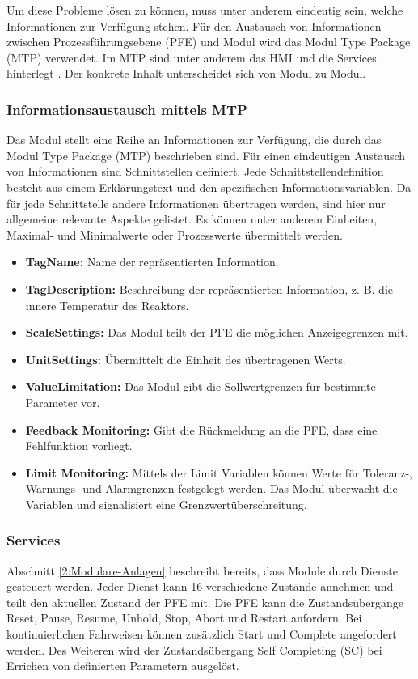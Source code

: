 Um diese Probleme lösen zu können, muss unter anderem eindeutig sein, welche Informationen zur Verfügung stehen. Für den Austausch von Informationen zwischen Prozessführungsebene (PFE) und Modul wird das Modul Type Package (MTP) verwendet. Im MTP sind unter anderem das HMI und die Services hinterlegt \cite{VDI2658-Blatt1}. Der konkrete Inhalt unterscheidet sich von Modul zu Modul.

\subsubsection*{Informationsaustausch mittels MTP}
Das Modul stellt eine Reihe an Informationen zur Verfügung, die durch das Modul Type Package (MTP) beschrieben sind. Für einen eindeutigen Austausch von Informationen sind Schnittstellen definiert. Jede Schnittstellendefinition besteht aus einem Erklärungstext und den spezifischen Informationsvariablen. Da für jede Schnittstelle andere Informationen übertragen werden, sind hier nur allgemeine relevante Aspekte gelistet. Es können unter anderem Einheiten, Maximal- und Minimalwerte oder Prozesswerte übermittelt werden. \cite{VDI2658-Blatt3}
\begin{itemize}
\item \textbf{TagName:} Name der repräsentierten Information. 
\item \textbf{TagDescription:} Beschreibung der repräsentierten Information, z. B. die innere Temperatur des Reaktors.
\item \textbf{ScaleSettings:} Das Modul teilt der PFE die möglichen Anzeigegrenzen mit.
\item \textbf{UnitSettings:} Übermittelt die Einheit des übertragenen Werts.
\item \textbf{ValueLimitation:} Das Modul gibt die Sollwertgrenzen für bestimmte Parameter vor.
\item \textbf{Feedback Monitoring:} Gibt die Rückmeldung an die PFE, dass eine Fehlfunktion vorliegt.
\item \textbf{Limit Monitoring:} Mittels der Limit Variablen können Werte für Toleranz-, Warnungs- und Alarmgrenzen festgelegt werden. Das Modul überwacht die Variablen und signalisiert eine Grenzwertüberschreitung.
\end{itemize}

\subsubsection*{Services}
Abschnitt \ref{2:Modulare-Anlagen} beschreibt bereits, dass Module durch Dienste gesteuert werden. Jeder Dienst kann 16 verschiedene Zustände annehmen und teilt den aktuellen Zustand der PFE mit. Die PFE kann die Zustandsübergänge Reset, Pause, Resume, Unhold, Stop, Abort und Restart anfordern. Bei kontinuierlichen Fahrweisen können zusätzlich Start und Complete angefordert werden. Des Weiteren wird der Zustandsübergang Self Completing (SC) bei Errichen von definierten Parametern ausgelöst. \cite{Bloch2017}


